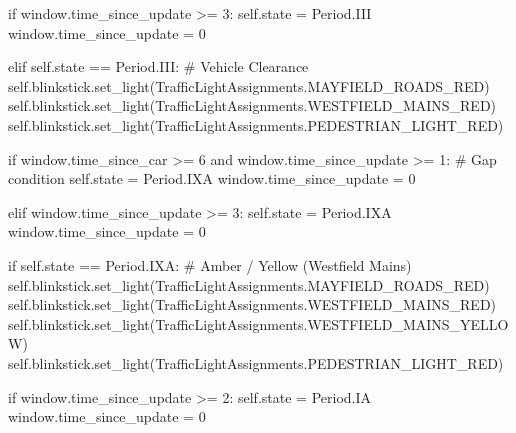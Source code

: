 \documentclass[
  letterpaper,
  DIV=11,
  numbers=noendperiod]{scrartcl}
\newenvironment{Shaded}{\begin{snugshade}}{\end{snugshade}}
\newcommand{\CommentTok}[1]{\textcolor[rgb]{0.37,0.37,0.37}{#1}}
\newcommand{\ControlFlowTok}[1]{\textcolor[rgb]{0.00,0.23,0.31}{#1}}
\newcommand{\DecValTok}[1]{\textcolor[rgb]{0.68,0.00,0.00}{#1}}
\newcommand{\KeywordTok}[1]{\textcolor[rgb]{0.00,0.23,0.31}{#1}}
\newcommand{\NormalTok}[1]{\textcolor[rgb]{0.00,0.23,0.31}{#1}}
\newcommand{\OperatorTok}[1]{\textcolor[rgb]{0.37,0.37,0.37}{#1}}
\newcommand{\VariableTok}[1]{\textcolor[rgb]{0.07,0.07,0.07}{#1}}
\begin{document}
\begin{Shaded}
\begin{Highlighting}[]
            \ControlFlowTok{if}\NormalTok{ window.time\_since\_update }\OperatorTok{\textgreater{}=} \DecValTok{3}\NormalTok{:}
                \VariableTok{self}\NormalTok{.state }\OperatorTok{=}\NormalTok{ Period.III}
\NormalTok{                window.time\_since\_update }\OperatorTok{=} \DecValTok{0}

        \ControlFlowTok{elif} \VariableTok{self}\NormalTok{.state }\OperatorTok{==}\NormalTok{ Period.III:}
            \CommentTok{\# Vehicle Clearance}
            \VariableTok{self}\NormalTok{.blinkstick.set\_light(TrafficLightAssignments.MAYFIELD\_ROADS\_RED)}
            \VariableTok{self}\NormalTok{.blinkstick.set\_light(TrafficLightAssignments.WESTFIELD\_MAINS\_RED)}
            \VariableTok{self}\NormalTok{.blinkstick.set\_light(TrafficLightAssignments.PEDESTRIAN\_LIGHT\_RED)}

            \ControlFlowTok{if}\NormalTok{ window.time\_since\_car }\OperatorTok{\textgreater{}=} \DecValTok{6} \KeywordTok{and}\NormalTok{ window.time\_since\_update }\OperatorTok{\textgreater{}=} \DecValTok{1}\NormalTok{:}
                \CommentTok{\# Gap condition}
                \VariableTok{self}\NormalTok{.state }\OperatorTok{=}\NormalTok{ Period.IXA}
\NormalTok{                window.time\_since\_update }\OperatorTok{=} \DecValTok{0}
            
            \ControlFlowTok{elif}\NormalTok{ window.time\_since\_update }\OperatorTok{\textgreater{}=} \DecValTok{3}\NormalTok{:}
                \VariableTok{self}\NormalTok{.state }\OperatorTok{=}\NormalTok{ Period.IXA}
\NormalTok{                window.time\_since\_update }\OperatorTok{=} \DecValTok{0}

        \ControlFlowTok{if} \VariableTok{self}\NormalTok{.state }\OperatorTok{==}\NormalTok{ Period.IXA:}
            \CommentTok{\# Amber / Yellow (Westfield Mains)}
            \VariableTok{self}\NormalTok{.blinkstick.set\_light(TrafficLightAssignments.MAYFIELD\_ROADS\_RED)}
            \VariableTok{self}\NormalTok{.blinkstick.set\_light(TrafficLightAssignments.WESTFIELD\_MAINS\_RED)}
            \VariableTok{self}\NormalTok{.blinkstick.set\_light(TrafficLightAssignments.WESTFIELD\_MAINS\_YELLOW)}
            \VariableTok{self}\NormalTok{.blinkstick.set\_light(TrafficLightAssignments.PEDESTRIAN\_LIGHT\_RED)}

            \ControlFlowTok{if}\NormalTok{ window.time\_since\_update }\OperatorTok{\textgreater{}=} \DecValTok{2}\NormalTok{:}
                \VariableTok{self}\NormalTok{.state }\OperatorTok{=}\NormalTok{ Period.IA}
\NormalTok{                window.time\_since\_update }\OperatorTok{=} \DecValTok{0}
            


\end{Highlighting}
\end{Shaded}
\end{document}
